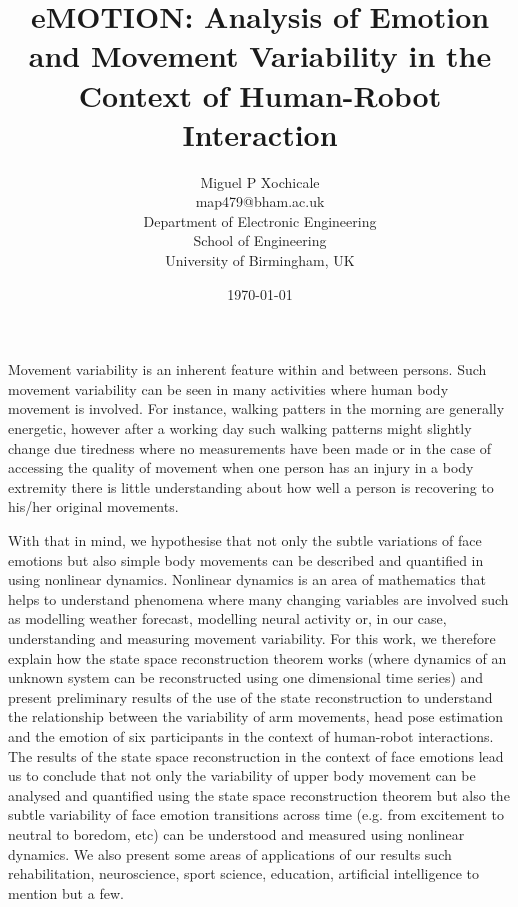 \documentclass[12pt]{article}
\author{Miguel P Xochicale\\
map479@bham.ac.uk \\
Department of Electronic Engineering\\
School of Engineering\\
University of Birmingham, UK}
\title{
eMOTION: Analysis of Emotion and Movement Variability in the Context of Human-Robot Interaction
}
\date{\today}
\begin{document}
\maketitle

Movement variability is an inherent feature within and between persons.
Such movement variability can be seen in many activities where human 
body movement is involved. For instance, walking patters in the morning
 are generally energetic, however after a working day such walking 
patterns might slightly change due tiredness where no measurements 
have been made or in the case of accessing the quality of movement 
when one person has an injury in a body extremity there is 
little understanding about how well a person is recovering 
to his/her original movements.

With that in mind, we hypothesise that not only the subtle 
variations of face emotions but also simple body movements can be 
described and quantified in using nonlinear dynamics.
Nonlinear dynamics is an area of mathematics that helps to 
understand phenomena where many changing variables are involved 
such as modelling weather forecast, modelling neural activity or, in our case,
 understanding and measuring movement variability.
For this work, we therefore explain how the state space reconstruction theorem 
works (where dynamics of an unknown system can be reconstructed using one dimensional 
time series) and
present preliminary results of the use of the state reconstruction
to understand the relationship between the variability of arm movements, head
pose estimation and the emotion of six participants in the context of 
human-robot interactions.
The results of the state space reconstruction in the context of face emotions 
lead us to conclude that not only the variability of upper body movement 
can be analysed and quantified using the state space reconstruction theorem
but also the subtle variability of face emotion transitions across time 
(e.g. from excitement to neutral to boredom, etc)
can be understood and measured using nonlinear dynamics.
We also present some areas of applications of our results such rehabilitation, 
neuroscience, sport science, education, artificial intelligence
to mention but a few.
\end{document}
